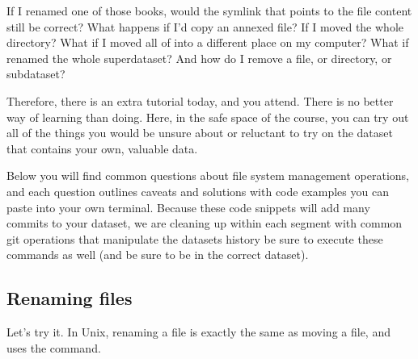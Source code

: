 \sphinxAtStartPar
If I renamed one of those books, would the symlink that points
to the file content still be correct? What happens if I’d copy
an annexed file?
If I moved the whole  directory? What if I moved
all of  into a different place on my computer?
What if renamed the whole superdataset?
And how do I remove a file, or directory, or subdataset?

\sphinxAtStartPar
Therefore, there is an extra tutorial today, and you attend.
There is no better way of learning than doing. Here, in the
safe space of the  course, you can try out all
of the things you would be unsure about or reluctant to try
on the dataset that contains your own, valuable data.

\sphinxAtStartPar
Below you will find common questions about file system
management operations, and each question outlines caveats and
solutions with code examples you can paste into your own terminal.
Because these code snippets will add many commits to your
dataset, we are cleaning up within each segment with
common git operations that manipulate the datasets
history \textendash{} be sure to execute these commands as well (and
be sure to be in the correct dataset).

\ignorespaces 

\subsection{Renaming files}
\label{\detokenize{basics/101-136-filesystem:renaming-files}}\label{\detokenize{basics/101-136-filesystem:index-0}}
\sphinxAtStartPar
Let’s try it. In Unix, renaming a file is exactly the same as
moving a file, and uses the  command.

